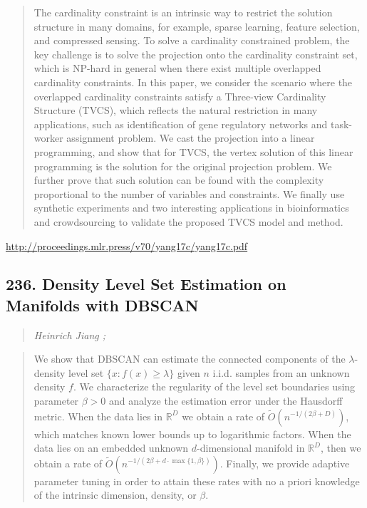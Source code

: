 \documentclass{article}
\begin{document}
\begin{quote}
    The cardinality constraint is an intrinsic way to restrict the solution structure in many domains, for example, sparse learning, feature selection, and compressed sensing. To solve a cardinality constrained problem, the key challenge is to solve the projection onto the cardinality constraint set, which is NP-hard in general when there exist multiple overlapped cardinality constraints. In this paper, we consider the scenario where the overlapped cardinality constraints satisfy a Three-view Cardinality Structure (TVCS), which reflects the natural restriction in many applications, such as identification of gene regulatory networks and task-worker assignment problem. We cast the projection into a linear programming, and show that for TVCS, the vertex solution of this linear programming is the solution for the original projection problem. We further prove that such solution can be found with the complexity proportional to the number of variables and constraints. We finally use synthetic experiments and two interesting applications in bioinformatics and crowdsourcing to validate the proposed TVCS model and method.  \end{quote}

\href{http://proceedings.mlr.press/v70/yang17c/yang17c.pdf}{http://proceedings.mlr.press/v70/yang17c/yang17c.pdf}

\subsection{236. Density Level Set Estimation on Manifolds with DBSCAN}

\begin{quote}
\footnotesize{\textit{Heinrich Jiang ;}}
\end{quote}

\begin{quote}
    We show that DBSCAN can estimate the connected components of the $\lambda$-density level set $\{ x : f(x) \ge \lambda\}$ given $n$ i.i.d. samples from an unknown density $f$. We characterize the regularity of the level set boundaries using parameter $\beta > 0$ and analyze the estimation error under the Hausdorff metric. When the data lies in $\mathbb{R}^D$ we obtain a rate of $\widetilde{O}(n^{-1/(2\beta + D)})$, which matches known lower bounds up to logarithmic factors. When the data lies on an embedded unknown $d$-dimensional manifold in $\mathbb{R}^D$, then we obtain a rate of $\widetilde{O}(n^{-1/(2\beta + d\cdot \max\{1, \beta \})})$. Finally, we provide adaptive parameter tuning in order to attain these rates with no a priori knowledge of the intrinsic dimension, density, or $\beta$.  \end{quote}
\end{document}
